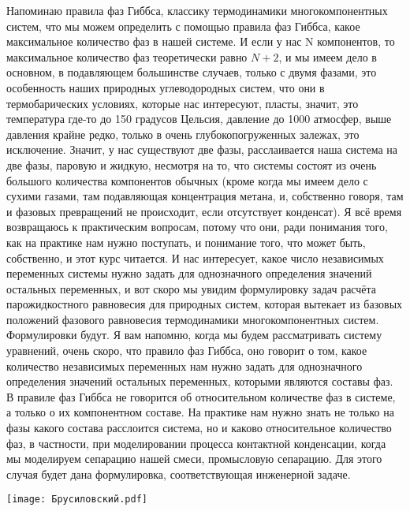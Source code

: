 \documentclass[main.tex]{subfiles}
\begin{document}
Напоминаю правила фаз Гиббса, классику термодинамики многокомпонентных систем, что мы можем определить с помощью правила фаз Гиббса, какое максимальное количество фаз в нашей системе.
И если у нас N компонентов, то максимальное количество фаз теоретически равно $N+2$, и мы имеем дело в основном, в подавляющем большинстве случаев, только с двумя фазами, это особенность наших природных углеводородных систем, что они в термобарических условиях, которые нас интересуют, пласты, значит, это температура где-то до 150 градусов Цельсия, давление до 1000 атмосфер, выше давления крайне редко, только в очень глубокопогруженных залежах, это исключение.
Значит, у нас существуют две фазы, расслаивается наша система на две фазы, паровую и жидкую, несмотря на то, что системы состоят из очень большого количества компонентов обычных (кроме когда мы имеем дело с сухими газами, там подавляющая концентрация метана, и, собственно говоря, там и фазовых превращений не происходит, если отсутствует конденсат).
Я всё время возвращаюсь к практическим вопросам, потому что они, ради понимания того, как на практике нам нужно поступать, и понимание того, что может быть, собственно, и этот курс читается.
И нас интересует, какое число независимых переменных системы нужно задать для однозначного определения значений остальных переменных, и вот скоро мы увидим формулировку задач расчёта парожидкостного равновесия для природных систем, которая вытекает из базовых положений фазового равновесия термодинамики многокомпонентных систем.
Формулировки будут.
Я вам напомню, когда мы будем рассматривать систему уравнений, очень скоро, что правило фаз Гиббса, оно говорит о том, какое количество независимых переменных нам нужно задать для однозначного определения значений остальных переменных, которыми являются составы фаз.
В правиле фаз Гиббса не говорится об относительном количестве фаз в системе, а только о их компонентном составе.
На практике нам нужно знать не только на фазы какого состава расслоится система, но и каково относительное количество фаз, в частности, при моделировании процесса контактной конденсации, когда мы моделируем сепарацию нашей смеси, промысловую сепарацию.
Для этого случая будет дана формулировка, соответствующая инженерной задаче.

\begin{center}
\texttt{[image: Брусиловский.pdf]}
\end{center}
\end{document}
